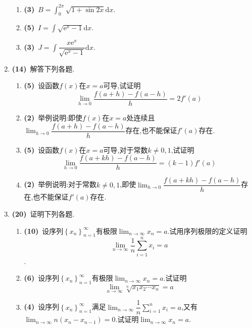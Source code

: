 \documentclass{ctexart}
\newcommand{\e}{\mathrm{e}}
\newcommand{\di}{\mathrm{d}}
\newcommand{\dx}{\di x}
\begin{document}
\begin{enumerate}[leftmargin=*,label=\textbf{\arabic*.}]
\begin{enumerate}[label=\textbf{(\arabic*)}]
                \item \textbf{(3)}\ $\displaystyle B=\int_{0}^{2\pi}\sqrt{1+\sin2x}\dx$.
                \item \textbf{(5)}\ $\displaystyle I=\int\sqrt{\e^x-1}\dx$.
                \item \textbf{(3)}\ $\displaystyle J=\int\dfrac{x\e^x}{\sqrt{\e^x-1}}\dx$.
            \end{enumerate}
        \item \textbf{(14)}\ 解答下列各题.
            \begin{enumerate}[label=\textbf{(\arabic*)}]
                \item \textbf{(5)}\ 设函数$f(x)$在$x=a$可导,试证明$$\lim_{h\to0}\dfrac{f(a+h)-f(a-h)}{h}=2f'(a)$$
                \item \textbf{(2)}\ 举例说明:即使$f(x)$在$x=a$处连续且$\displaystyle\lim_{h\to0}\dfrac{f(a+h)-f(a-h)}{h}$存在,也不能保证$f'(a)$存在.
                \item \textbf{(5)}\ 设函数$f(x)$在$x=a$可导,对于常数$k\neq0,1$,试证明$$\lim_{h\to0}\dfrac{f(a+kh)-f(a-h)}{h}=(k-1)f'(a)$$
                \item \textbf{(2)}\ 举例说明:对于常数$k\neq0,1$,即使$\displaystyle\lim_{h\to0}\dfrac{f(a+kh)-f(a-h)}{h}$存在,也不能保证$f'(a)$存在.
            \end{enumerate}
        \item \textbf{(20)}\ 证明下列各题.
            \begin{enumerate}[label=\textbf{(\arabic*)}]
                \item \textbf{(10)}\ 设序列$\left\{x_n\right\}_{n=1}^{\infty}$有极限$\displaystyle\lim_{n\to\infty}x_n=a$.试用序列极限的定义证明$$\displaystyle\lim_{n\to\infty}\dfrac{1}{n}\sum_{i=1}^{n}x_i=a$$.
                \item \textbf{(6)}\ 设序列$\left\{x_n\right\}_{n=1}^{\infty}$有极限$\displaystyle\lim_{n\to\infty}x_n=a$.试证明$$\lim_{n\to\infty}\sqrt[n]{x_1x_2\cdots x_n}=a$$
                \item \textbf{(4)}\ 设序列$\left\{x_n\right\}_{n=1}^{\infty}$满足$\displaystyle\lim_{n\to\infty}\dfrac{1}{n}\sum_{i=1}^{n}x_i=a$,又有$\displaystyle\lim_{n\to\infty}n\left(x_n-x_{n-1}\right)=0$.试证明$\displaystyle\lim_{n\to\infty}x_n=a$.
            \end{enumerate}
\end{enumerate}
\end{document}
